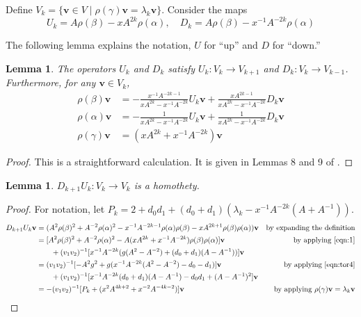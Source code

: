 \documentclass{article}
\renewcommand{\v}{\mathbf{v}}
\renewcommand{\a}{\alpha}
\renewcommand{\b}{\beta}
\newcommand{\g}{\gamma}
\newtheorem{lemma}[theorem]{Lemma}
\theoremstyle{definition}
\renewcommand{\g}{\gamma}
\renewcommand{\a}{\alpha}
\renewcommand{\b}{\beta}
\begin{document}
Define $V_k=\{\v\in V\mid \rho(\gamma)\v=\lambda_k\v\}$.  Consider the maps
\[    
U_k=A\rho(\b)-xA^{2k}\rho(\a), \quad D_k=A\rho(\b)-x^{-1}A^{-2k}\rho(\a)
\]

The following lemma explains the notation, $U$ for ``up'' and $D$ for ``down.''

\begin{lemma}
    The operators $U_k$ and $D_k$ satisfy $U_k:V_k\to V_{k+1}$ and $D_k:V_k\to V_{k-1}$. Furthermore, for any $\v\in V_k$,
    \begin{align*}
        \rho(\beta)\v&=-\frac{x^{-1}A^{-2k-1}}{xA^{2k}-x^{-1}A^{-2k}}U_k\v+\frac{xA^{2k-1}}{xA^{2k}-x^{-1}A^{-2k}}D_k\v\\
        \rho(\alpha)\v&=-\frac{1}{xA^{2k}-x^{-1}A^{-2k}}U_k\v+\frac{1}{xA^{2k}-x^{-1}A^{-2k}}D_k\v\\
        \rho(\g)\v&=(xA^{2k}+x^{-1}A^{-2k})\v
    \end{align*}
\end{lemma}
\begin{proof}
    This is a straightforward calculation. It is given in Lemmas 8 and 9 of \cite{TakenovReps}.
\end{proof}

\begin{lemma}\label{lem:DU-central}
    $D_{k+1}U_k:V_k\to V_k$ is a homothety.
\end{lemma}
\begin{proof}
For notation, let $P_k=2+d_0d_1+(d_0+d_1)(\lambda_k-x^{-1}A^{-2k}(A+A^{-1}))$.
    \begin{align*}
        D_{k+1}U_k\v&=(A^2\rho(\beta)^2+A^{-2}\rho(\alpha)^2-x^{-1}A^{-2k-1}\rho(\alpha)\rho(\beta)-xA^{2k+1}\rho(\beta)\rho(\alpha))\v &\text{by expanding the definition}\\
        &=[A^2\rho(\beta)^2+A^{-2}\rho(\alpha)^2-A(xA^{2k}+x^{-1}A^{-2k})\rho(\beta)\rho(\alpha)]\v &\text{by applying \eqref{eqn:1}}\\
        &\qquad +(v_1v_2)^{-1} [x^{-1}A^{-2k}(g(A^2-A^{-2})+(d_0+d_1)(A-A^{-1}))]\v&\\
        &=(v_1v_2)^{-1}[-A^2g^2+g(x^{-1}A^{-2k}(A^2-A^{-2})-d_0-d_1)]\v&\text{by applying \eqref{eqn:tor4}}\\
        &\qquad+(v_1v_2)^{-1} [x^{-1}A^{-2k}(d_0+d_1)(A-A^{-1})-d_0d_1+(A-A^{-1})^2]\v&\\
        &=-(v_1v_2)^{-1}[P_k+(x^2A^{4k+2}+x^{-2}A^{-4k-2})]\v &\text{by applying }\rho(\g)\v=\lambda_k\v
    \end{align*}
\end{proof}
\end{document}
